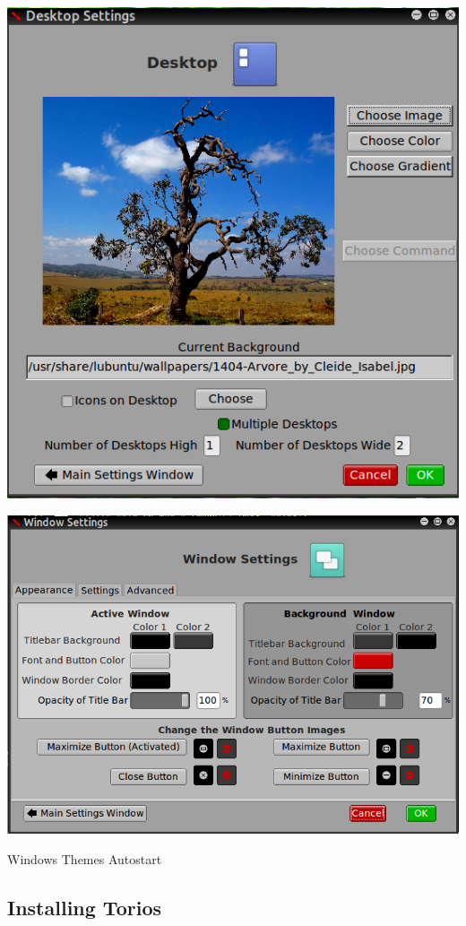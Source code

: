 \documentclass[12pt,a4paper]{book}
\begin{document}
\begin{center}
\includegraphics[width=0.7\linewidth]{desktop-settings}
\end{center}

\begin{center}
\includegraphics[width=0.7\linewidth]{window-settings}
\end{center}










{Windows}
{Themes}
{Autostart}






\subsection{Installing Torios}
\end{document}
